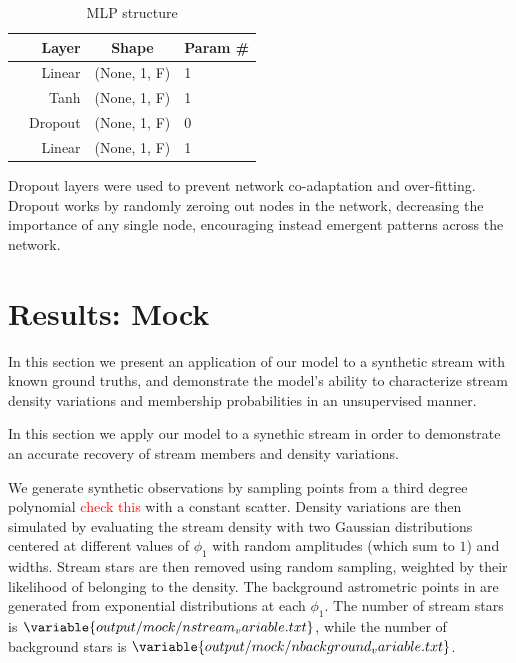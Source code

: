 \documentclass[twocolumn]{aastex631}
\newcommand{\TODO}[1]{{\textcolor{red}{#1}}}
\newcommand{\JN}[1]{\TODO{#1}}
\begin{document}
        \begin{table}
            \centering
            \caption{MLP structure}
            \begin{tabular}{@{}rrcl@{}}
            \toprule
            & Layer & Shape & Param \# \\
            \midrule
            & Linear & (None, 1, F) & 1  \\
            & Tanh & (None, 1, F) & 1  \\
            & Dropout & (None, 1, F) & 0  \\
            & Linear & (None, 1, F) & 1  \\
            \bottomrule
            \end{tabular}
        \end{table}

        Dropout layers were used to prevent network co-adaptation and over-fitting. Dropout works by randomly zeroing out nodes in the network, decreasing the importance of any single node, encouraging instead emergent patterns across the network.

        

\section{Results: Mock} \label{sec:results_mock}

    In this section we present an application of our model to a synthetic stream with known ground truths, and demonstrate the model's ability to characterize stream density variations and membership probabilities in an unsupervised manner.

    
        In this section we apply our model to a synethic stream in order to demonstrate an accurate recovery of stream members and density variations.
    
        We generate synthetic observations by sampling points from a third degree polynomial \JN{check this} with a constant scatter. Density variations are then simulated by evaluating the stream density with two Gaussian distributions centered at different values of $\phi_1$ with random amplitudes (which sum to $1$) and widths. Stream stars are then removed using random sampling, weighted by their likelihood of belonging to the density. The background astrometric  points in are generated from exponential distributions at each $\phi_1$. The number of stream stars is $\variable{output/mock/nstream_variable.txt}$, while the number of background stars is $\variable{output/mock/nbackground_variable.txt}$.
\end{document}

